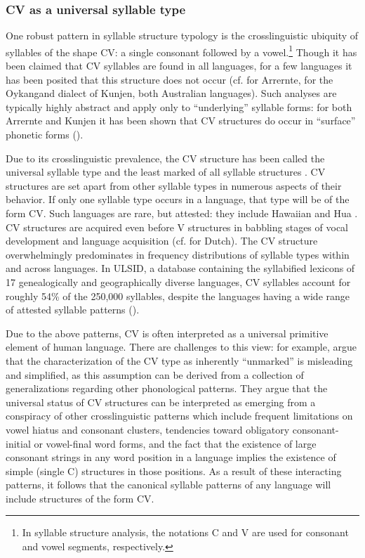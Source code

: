 \subsubsection{{CV} {as} {a} {universal} {syllable} {type}}\label{sec:1.1.2.1}

 One robust pattern in syllable structure typology is the crosslinguistic ubiquity of syllables of the shape CV: a single consonant followed by a vowel.\footnote{{In syllable structure analysis, the notations C and V are used for consonant and vowel segments, respectively.}} Though it has been claimed that CV syllables are found in all languages, for a few languages it has been posited that this structure does not occur (cf. \citealt{BreenPensalfini1999} for Arrernte, \citealt{Sommer1969} for the Oykangand dialect of Kunjen, both Australian languages). Such analyses are typically highly abstract and apply only to ``underlying'' syllable forms: for both Arrernte and Kunjen it has been shown that CV structures do occur in ``surface'' phonetic forms (\citealt{Anderson2000,Sommer1969,Sommer1981}).

  Due to its crosslinguistic prevalence, the CV structure has been called the universal syllable type and the least marked of all syllable structures \citep{Zec2007}. CV structures are set apart from other syllable types in numerous aspects of their behavior. If only one syllable type occurs in a language, that type will be of the form CV. Such languages are rare, but attested: they include Hawaiian \citep{Maddieson2011} and Hua \citep{Blevins1995}. CV structures are acquired even before V structures in babbling stages of vocal development and language acquisition (cf. \citealt{LeveltEtAl2000} for Dutch). The CV structure overwhelmingly predominates in frequency distributions of syllable types within and across languages. In ULSID, a database containing the syllabified lexicons of 17 genealogically and geographically diverse languages, CV syllables account for roughly 54\% of the 250,000 syllables, despite the languages having a wide range of attested syllable patterns (\citealt{ValléeEtAl2009}).

  Due to the above patterns, CV is often interpreted as a universal primitive element of human language. There are challenges to this view: for example, \citet{BellHooper1978} argue that the characterization of the CV type as inherently ``unmarked'' is misleading and simplified, as this assumption can be derived from a collection of generalizations regarding other phonological patterns. They argue that the universal status of CV structures can be interpreted as emerging from a conspiracy of other crosslinguistic patterns which include frequent limitations on vowel hiatus and consonant clusters, tendencies toward obligatory consonant-initial or vowel-final word forms, and the fact that the existence of large consonant strings in any word position in a language implies the existence of simple (single C) structures in those positions. As a result of these interacting patterns, it follows that the canonical syllable patterns of any language will include structures of the form CV.

